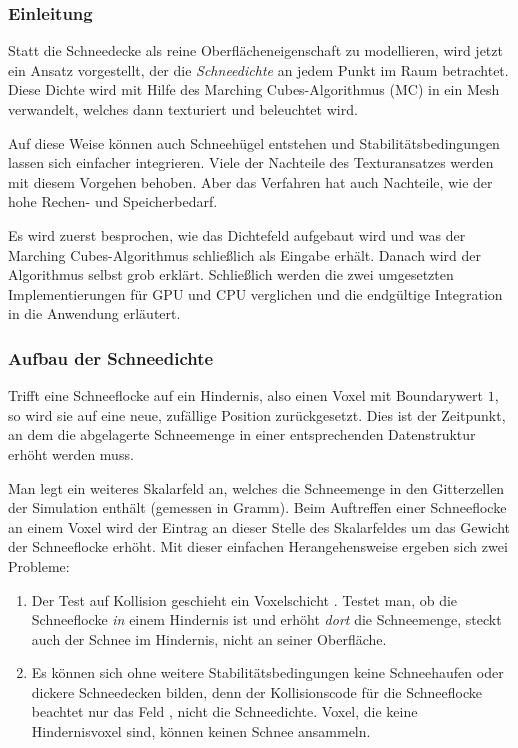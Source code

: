 \subsubsection{Einleitung}

Statt die Schneedecke als reine Oberflächeneigenschaft zu modellieren,
wird jetzt ein Ansatz vorgestellt, der die \emph{Schneedichte} an
jedem Punkt im Raum betrachtet. Diese Dichte wird mit Hilfe des
Marching Cubes-Algorithmus (MC) in ein Mesh verwandelt, welches dann
texturiert und beleuchtet wird.

Auf diese Weise können auch Schneehügel entstehen und
Stabilitätsbedingungen lassen sich einfacher integrieren. Viele der
Nachteile des Texturansatzes werden mit diesem Vorgehen behoben. Aber
das Verfahren hat auch Nachteile, wie der hohe Rechen- und
Speicherbedarf.

Es wird zuerst besprochen, wie das Dichtefeld aufgebaut wird und was
der Marching Cubes-Algorithmus schließlich als Eingabe erhält. Danach
wird der Algorithmus selbst grob erklärt. Schließlich werden die zwei
umgesetzten Implementierungen für GPU und CPU verglichen und die
endgültige Integration in die Anwendung erläutert.

\subsubsection{Aufbau der Schneedichte}

Trifft eine Schneeflocke auf ein Hindernis, also einen Voxel mit
Boundarywert $1$, so wird sie auf eine neue, zufällige Position
zurückgesetzt. Dies ist der Zeitpunkt, an dem die abgelagerte
Schneemenge in einer entsprechenden Datenstruktur erhöht werden muss.

Man legt ein weiteres Skalarfeld  an,
welches die Schneemenge in den Gitterzellen der Simulation enthält
(\PimiddyzB gemessen in Gramm). Beim Auftreffen einer Schneeflocke an
einem Voxel wird der Eintrag an dieser Stelle des Skalarfeldes um das
Gewicht der Schneeflocke erhöht. Mit dieser einfachen Herangehensweise
ergeben sich zwei Probleme:

\begin{enumerate}
\item Der Test auf Kollision geschieht ein Voxelschicht
. Testet man, ob die Schneeflocke \emph{in}
einem Hindernis ist und erhöht \emph{dort} die Schneemenge, steckt
auch der Schnee im Hindernis, nicht an seiner Oberfläche.
\item Es können sich ohne weitere Stabilitätsbedingungen keine
Schneehaufen oder dickere Schneedecken bilden, denn der Kollisionscode
für die Schneeflocke beachtet nur das Feld
, nicht die Schneedichte. Voxel, die keine
Hindernisvoxel sind, können keinen Schnee ansammeln.
\end{enumerate}

